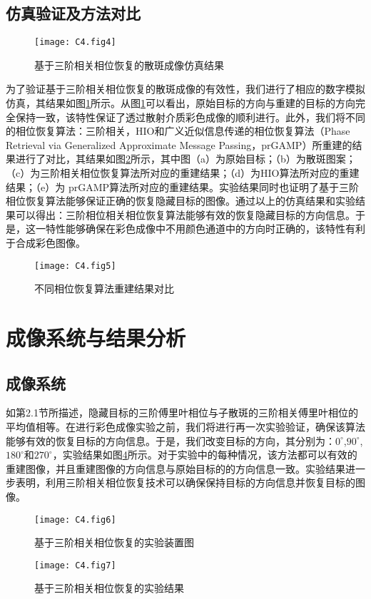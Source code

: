 \subsection{仿真验证及方法对比}

\begin{figure}[htp]
	\centering
	\texttt{[image: C4.fig4]}
	\caption{基于三阶相关相位恢复的散斑成像仿真结果}
	\label{fig:4.4}
\end{figure}

为了验证基于三阶相关相位恢复的散斑成像的有效性，我们进行了相应的数字模拟仿真，其结果如图\ref{fig:4.4}所示。从图\ref{fig:4.4}可以看出，原始目标的方向与重建的目标的方向完全保持一致，该特性保证了透过散射介质彩色成像的顺利进行。此外，我们将不同的相位恢复算法：三阶相关，HIO和广义近似信息传递的相位恢复算法（Phase Retrieval via Generalized Approximate Message Passing，prGAMP）所重建的结果进行了对比，其结果如图\ref{fig:4.5}所示，其中图（a）为原始目标；（b）为散斑图案；（c）为三阶相关相位恢复算法所对应的重建结果；（d）为HIO算法所对应的重建结果；（e）为 prGAMP算法所对应的重建结果。实验结果同时也证明了基于三阶相位恢复算法能够保证正确的恢复隐藏目标的图像。通过以上的仿真结果和实验结果可以得出：三阶相位相关相位恢复算法能够有效的恢复隐藏目标的方向信息。于是，这一特性能够确保在彩色成像中不用颜色通道中的方向时正确的，该特性有利于合成彩色图像。

\begin{figure}[htp]
	\centering
	\texttt{[image: C4.fig5]}
	\caption{不同相位恢复算法重建结果对比}
	\label{fig:4.5}
\end{figure}

\section{成像系统与结果分析}
\subsection{成像系统}

如第2.1节所描述，隐藏目标的三阶傅里叶相位与子散斑的三阶相关傅里叶相位的平均值相等。在进行彩色成像实验之前，我们将进行再一次实验验证，确保该算法能够有效的恢复目标的方向信息。于是，我们改变目标的方向，其分别为：$0^{\circ}$,$90^{\circ}$,$180^{\circ}$和$270^{\circ}$，实验结果如图\ref{fig:4.7}所示。对于实验中的每种情况，该方法都可以有效的重建图像，并且重建图像的方向信息与原始目标的的方向信息一致。实验结果进一步表明，利用三阶相关相位恢复技术可以确保保持目标的方向信息并恢复目标的图像。

\begin{figure}[htp]
	\centering
	\texttt{[image: C4.fig6]}
	\caption{基于三阶相关相位恢复的实验装置图}
	\label{fig:4.6}
\end{figure}
\begin{figure}[htp]
	\centering
	\texttt{[image: C4.fig7]}
	\caption{基于三阶相关相位恢复的实验结果}
	\label{fig:4.7}
\end{figure}

